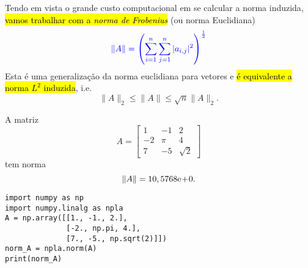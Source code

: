 Tendo em vista o grande custo computacional em se calcular a norma induzida, \hl{vamos trabalhar com a \emph{norma de Frobenius}} (ou norma Euclidiana{\euclides})
\begin{equation}\color{blue}\|A\| = \left(\sum_{i=1}^n\sum_{j=1}^n|a_{i,j}|^2\right)^{\frac{1}{2}}
\end{equation}
Esta é uma generalização da norma euclidiana para vetores e \hl{é equivalente a norma $L^2$ induzida}, i.e.
\begin{equation}
  \|A\|_2 \leq \|A\| \leq \sqrt{n}\|A\|_2.
\end{equation}

\begin{ex}\label{ex:norma_matriz}
  A matriz
  \begin{equation}
    A =
    \begin{bmatrix}
      1 & -1 & 2\\
      -2 & \pi & 4\\
      7 & -5 & \sqrt{2}
    \end{bmatrix}
  \end{equation}
  tem norma
  \begin{equation}
    \|A\| = 10,5768\mathrm{e}\!+\!0.
  \end{equation}

  \begin{lstlisting}
import numpy as np
import numpy.linalg as npla
A = np.array([[1., -1., 2.],
              [-2., np.pi, 4.],
              [7., -5., np.sqrt(2)]])
norm_A = npla.norm(A)
print(norm_A)
\end{lstlisting}

\end{ex}



